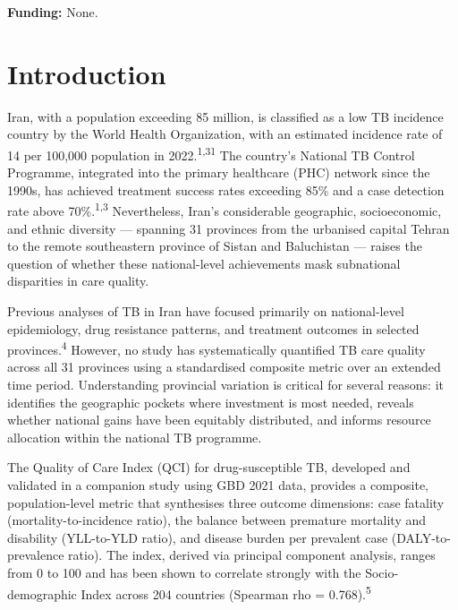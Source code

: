 \documentclass[12pt]{article}
\begin{document}
\textbf{Funding:} None.

\newpage


\section{Introduction}

Iran, with a population exceeding 85 million, is classified as a low TB incidence country by the World Health Organization, with an estimated incidence rate of 14 per 100,000 population in 2022.\textsuperscript{1,31} The country's National TB Control Programme, integrated into the primary healthcare (PHC) network since the 1990s, has achieved treatment success rates exceeding 85\% and a case detection rate above 70\%.\textsuperscript{1,3} Nevertheless, Iran's considerable geographic, socioeconomic, and ethnic diversity --- spanning 31 provinces from the urbanised capital Tehran to the remote southeastern province of Sistan and Baluchistan --- raises the question of whether these national-level achievements mask subnational disparities in care quality.

Previous analyses of TB in Iran have focused primarily on national-level epidemiology, drug resistance patterns, and treatment outcomes in selected provinces.\textsuperscript{4} However, no study has systematically quantified TB care quality across all 31 provinces using a standardised composite metric over an extended time period. Understanding provincial variation is critical for several reasons: it identifies the geographic pockets where investment is most needed, reveals whether national gains have been equitably distributed, and informs resource allocation within the national TB programme.

The Quality of Care Index (QCI) for drug-susceptible TB, developed and validated in a companion study using GBD 2021 data, provides a composite, population-level metric that synthesises three outcome dimensions: case fatality (mortality-to-incidence ratio), the balance between premature mortality and disability (YLL-to-YLD ratio), and disease burden per prevalent case (DALY-to-prevalence ratio). The index, derived via principal component analysis, ranges from 0 to 100 and has been shown to correlate strongly with the Socio-demographic Index across 204 countries (Spearman rho = 0.768).\textsuperscript{5}
\end{document}
